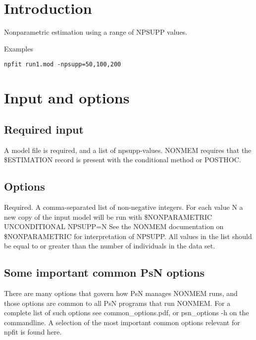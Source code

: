 

\newcommand{\guidetoolname}{npfit}



\maketitle


\section{Introduction}
Nonparametric estimation using a range of NPSUPP values.

Examples
\begin{verbatim}
npfit run1.mod -npsupp=50,100,200
\end{verbatim}

\section{Input and options}

\subsection{Required input}
A model file is required, and a list of npsupp-values.
NONMEM requires that the \$ESTIMATION record is present with the conditional method or POSTHOC.

\subsection{Options}
\begin{optionlist}
Required. A comma-separated list of non-negative integers.
For each value N a new copy of the input model will be run with
\$NONPARAMETRIC UNCONDITIONAL NPSUPP=N
See the NONMEM documentation on \$NONPARAMETRIC for interpretation of NPSUPP.
All values in the list should be equal to or greater than the number
of individuals in the data set.
\nextopt
\end{optionlist}

\subsection{Some important common PsN options}
There are many options that govern how PsN manages NONMEM runs, and
those options are common to all PsN programs that run NONMEM.
For a complete list of such options see common\_options.pdf, 
or psn\_options -h on the commandline. A selection of
the most important common options relevant for npfit is found here.


